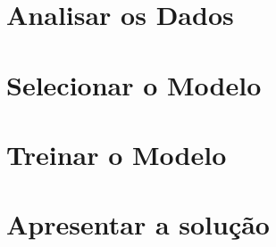 \section{Analisar os Dados}
\section{Selecionar o Modelo}
\section{Treinar o Modelo}
\section{Apresentar a solução}